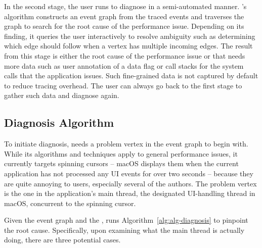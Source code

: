 In the second stage, the user runs \xxx to diagnose in a semi-automated
manner.  \xxx's algorithm constructs an event graph from the traced events
and traverses the graph to search for the root cause of the performance
issue.  Depending on its finding, it queries the user interactively to
resolve ambiguity such as determining which edge \xxx should follow when a
vertex has multiple incoming edges.  The result from this stage is either
the root cause of the performance issue or that \xxx needs more data such
as user annotation of a data flag or call stacks for the system calls that
the application issues.  Such fine-grained data is not captured by default
to reduce tracing overhead.  The user can always go back to the first
stage to gather such data and diagnose again.

\subsection{Diagnosis Algorithm} \label{subsec:debug} \label{subsec:similarvertex}

To initiate diagnosis, \xxx needs a problem vertex in the event graph to
begin with. While its algorithms and techniques apply to general
performance issues, it currently targets spinning cursors -- macOS
displays them when the current application has not processed any UI events
for over two seconds -- because they are quite annoying to users,
especially several of the authors.  The problem vertex is the one in the
application's main thread, the designated UI-handling thread in macOS,
concurrent to the spinning cursor.



Given the event graph and the \spinningnode, \xxx runs
Algorithm~\ref{alg:alg-diagnosis} to pinpoint the root cause.  Specifically,
upon examining what the main thread is actually doing, there are three
potential cases.

